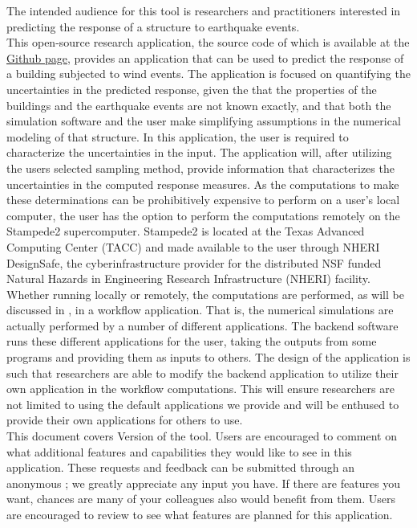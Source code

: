 The intended audience for this tool is researchers and practitioners
interested in predicting the response of a structure to earthquake
events.\\

This open-source research application, the source code of which is
available at
the \href{https://github.com/NHERI-SimCenter/EE-UQ}{\texttt{\getsoftwarename{}}
Github page}, provides an application that can be used to predict the
response of a building subjected to wind events. The application
is focused on quantifying the uncertainties in the predicted response,
given the that the properties of the buildings and the earthquake
events are not known exactly, and that both the simulation software
and the user make simplifying assumptions in the numerical modeling of
that structure. In this application, the user is required to
characterize the uncertainties in the input. The application will,
after utilizing the users selected sampling method, provide
information that characterizes the uncertainties in the computed
response measures. As the computations to make these determinations
can be prohibitively expensive to perform on a user's local computer,
the user has the option to perform the computations remotely on the
Stampede2 supercomputer. Stampede2 is located at the Texas Advanced
Computing Center (TACC) and made available to the user through NHERI
DesignSafe, the cyberinfrastructure provider for the distributed NSF
funded Natural Hazards in Engineering Research Infrastructure (NHERI)
facility.\\

Whether running locally or remotely, the computations are performed,
as will be discussed in , in a workflow
application. That is, the numerical simulations are actually performed
by a number of different applications. The \texttt{\getsoftwarename{}} backend software runs
these different applications for the user, taking the outputs from
some programs and providing them as inputs to others. The design of
the \texttt{\getsoftwarename{}} application is such that researchers are able to modify the
backend application to utilize their own application in the workflow
computations. This will ensure researchers are not limited to using
the default applications we provide and will be enthused to provide
their own applications for others to use. \\

This document covers Version \getsoftwareversion{} of the tool. Users are
encouraged to comment on what additional features and capabilities
they would like to see in this application. These requests and
feedback can be submitted through an anonymous ; we greatly appreciate any input you have. If there are
features you want, chances are many of your colleagues also would
benefit from them. Users are encouraged to review
 to see what features are planned for this
application.
